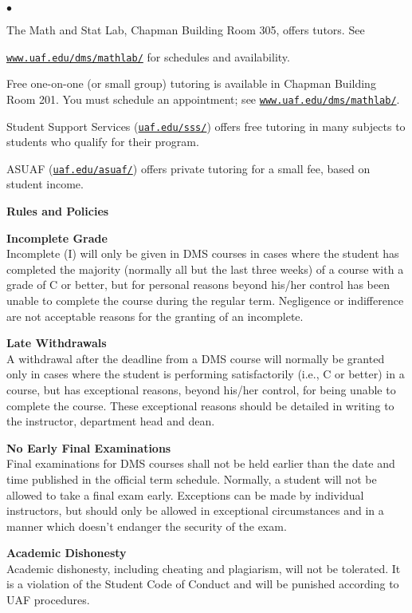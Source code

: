 \documentclass[12pt]{article}
\renewcommand{\emph}[1]{\textsf{\textbf{#1}}}
\newcommand{\localhead}[1]{\par\smallskip\textbf{#1} \smallskip\nobreak\\}%
\def\heading#1{\localhead{\large\emph{#1}}}
\def\subheading#1{\localhead{\emph{#1}}}
\newenvironment{clist}%
{\bgroup\parskip 0pt\begin{list}{$\bullet$}{\partopsep 4pt\topsep 0pt\itemsep -2pt}}%
{\end{list}\egroup}%
\begin{document}
\begin{clist}
    	\item The Math and Stat Lab, Chapman Building Room 305, offers tutors. 
	See 

	\href{http://www.uaf.edu/dms/mathlab/}{\texttt{www.uaf.edu/dms/mathlab/}} for schedules and availability.
	\item Free
one-on-one (or small group) tutoring is available in 
Chapman Building Room 201. You must schedule an
appointment; see \href{http://www.uaf.edu/dms/mathlab/}{\texttt{www.uaf.edu/dms/mathlab/}}.
	\item Student Support Services (\href{https://uaf.edu/sss/}{\texttt{uaf.edu/sss/}}) offers free tutoring in many subjects to students who qualify for their program.
	\item ASUAF (\href{https://uaf.edu/asuaf/}{\texttt{uaf.edu/asuaf/}}) offers private tutoring for a small fee, based on student income.
\end{clist}

\heading{Rules and Policies}
\vskip -20pt

\subheading{Incomplete Grade} 
Incomplete (I) will only be given in
  DMS courses in cases where
  the student has completed the majority (normally all but the last
  three weeks) of a course with a grade of C or better, but for
  personal reasons beyond his/her control has been unable to complete
  the course during the regular term. Negligence or indifference are
  not acceptable reasons for the granting of an incomplete. 

\subheading{Late Withdrawals} 
A withdrawal after the deadline from a DMS course will
  normally be granted only in cases where the student is performing
  satisfactorily (i.e., C or better) in a course, but has exceptional
  reasons, beyond his/her control, for being unable to complete the
  course. These exceptional reasons should be detailed in writing to
  the instructor, department head and dean.

\subheading{No Early Final Examinations}
Final examinations for DMS
  courses shall not be held earlier than the date and time published
  in the official term schedule. Normally, a student will not be
  allowed to take a final exam early. Exceptions can be made by
  individual instructors, but should only be allowed in exceptional
  circumstances and in a manner which doesn't endanger the security of
  the exam.

\subheading{Academic Dishonesty}
Academic dishonesty, including cheating and plagiarism, will not
be tolerated.  It is a violation of the Student Code of Conduct
and will be punished according to UAF procedures.
\end{document}
